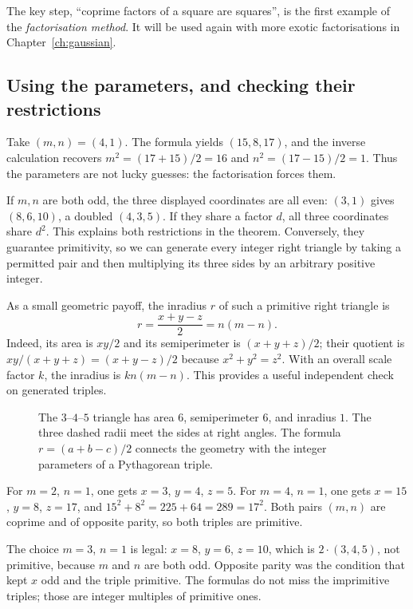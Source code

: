 The key step, ``coprime factors of a square are squares'', is the first example of the \emph{factorisation method}. It will be used again with more exotic factorisations in Chapter~\ref{ch:gaussian}.

\subsection*{Using the parameters, and checking their restrictions}
Take $(m,n)=(4,1)$. The formula yields $(15,8,17)$, and the inverse calculation recovers $m^2=(17+15)/2=16$ and $n^2=(17-15)/2=1$. Thus the parameters are not lucky guesses: the factorisation forces them.

If $m,n$ are both odd, the three displayed coordinates are all even: $(3,1)$ gives $(8,6,10)$, a doubled $(4,3,5)$. If they share a factor $d$, all three coordinates share $d^2$. This explains both restrictions in the theorem. Conversely, they guarantee primitivity, so we can generate every integer right triangle by taking a permitted pair and then multiplying its three sides by an arbitrary positive integer.

As a small geometric payoff, the inradius $r$ of such a primitive right triangle is
\[
r=\frac{x+y-z}{2}=n(m-n).
\]
Indeed, its area is $xy/2$ and its semiperimeter is $(x+y+z)/2$; their quotient is $xy/(x+y+z)=(x+y-z)/2$ because $x^2+y^2=z^2$. With an overall scale factor $k$, the inradius is $kn(m-n)$. This provides a useful independent check on generated triples.

\begin{figure}[ht]
\centering
{}
\caption{The $3$--$4$--$5$ triangle has area $6$, semiperimeter $6$, and inradius $1$. The three dashed radii meet the sides at right angles. The formula $r=(a+b-c)/2$ connects the geometry with the integer parameters of a Pythagorean triple.}
\label{fig:incircle}
\end{figure}

\begin{examplex}
For $m=2$, $n=1$, one gets $x=3$, $y=4$, $z=5$.
For $m=4$, $n=1$, one gets $x=15$, $y=8$, $z=17$, and $15^2+8^2=225+64=289=17^2$.
Both pairs $(m,n)$ are coprime and of opposite parity, so both triples are primitive.
\end{examplex}

\begin{examplex}
The choice $m=3$, $n=1$ is legal: $x=8$, $y=6$, $z=10$, which is $2\cdot(3,4,5)$, not primitive, because $m$ and $n$ are both odd. Opposite parity was the condition that kept $x$ odd and the triple primitive. The formulas do not miss the imprimitive triples; those are integer multiples of primitive ones.
\end{examplex}

